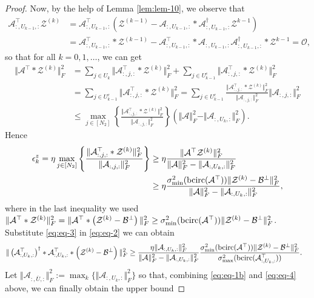 \documentclass[11pt]{article}
\def\fm#1{\mathcal{#1}}
\def \a#1{\fm A_{:, #1, :}}
\begin{document}
\begin{proof}
Now,  by the help of Lemma \ref{lem:lem-10}, we observe that
\begin{align*}
    \a{U_{k-1}}^\top \fm Z^{(k)} & = \a{U_{k-1}}^\top \left( \fm Z^{(k-1)} - \a{U_{k-1}}*\a{U_{k-1}}^\dagger \fm Z^{k-1} \right)\\
    & =  \a{U_{k-1}}^\top*\fm Z^{(k-1)} - \a{U_{k-1}}^\top *\a{U_{k-1}}\a{U_{k-1}}^\dagger* \fm Z^{k-1} = \fm O, 
\end{align*}
so that for all $k=0, 1, \ldots$, we can get
\begin{align*}
    \Vert \fm A^\top * \fm Z^{(k)}\Vert_F^2  & = \sum_{j \in U_k} \Vert \a j ^\top  * \fm Z^{(k)} \Vert_F^2 + \sum_{j\in U^c_{k-1}}\Vert \a j ^\top  * \fm Z^{(k)} \Vert_F^2 \\
    &=  \sum_{j\in U^c_{k-1}}\Vert \a j ^\top  * \fm Z^{(k)} \Vert_F^2  =  \sum_{j\in U^c_{k-1}} \frac{ \Vert \a j ^\top  * \fm Z^{(k)} \Vert_F^2}{ \Vert \a j \Vert_F^2}\Vert \a j \Vert_F^2\\
    & \leq \max_{j \in [N_2]}\left\{  \frac{ \Vert \a j ^\top  * \fm Z^{(k)} \Vert_F^2}{ \Vert \a j \Vert_F^2} \right\}\left(\Vert \fm A \Vert_F^2 - \Vert \a{U_k} \Vert_F^2 \right).
\end{align*}
Hence
\begin{align}
    \epsilon^z_k = \eta \max_{j \in [N_2]}\left\{  \frac{ \Vert \a j ^\top  * \fm Z^{(k)} \Vert_F^2}{ \Vert \a j \Vert_F^2} \right\} &\geq \eta \frac{ \Vert \fm A^\top \fm Z^{(k)}\Vert_F^2}{\Vert \fm A \Vert_F^2 - \Vert \a{U_k} \Vert_F^2} \notag\\
    & \geq \eta\frac{ \sigma_{\min}^2(\bcirc(\fm A^\top)) \Vert \fm Z^{(k)}-\fm B^\perp \Vert_F^2}{\Vert \fm A \Vert_F^2 - \Vert \a{U_k} \Vert_F^2},  \label{eq:eq-3}
\end{align}
where in the last inequality we used $ \Vert \fm A^\top *  \fm Z^{(k)}\Vert_F^2 =  \Vert \fm A^\top * \left( \fm Z^{(k)} - \fm B^\perp \right)\Vert_F^2 \geq \sigma_{\min}^2(\bcirc(\fm A^\top)) \Vert \fm Z^{(k)}-\fm B^\perp \Vert_F^2 $.\\
Substitute \eqref{eq:eq-3} in \eqref{eq:eq-2} we can obtain
\begin{align}
     \Vert \left(\a{U_k}^\top \right)^\dagger * \a{U_k}^\top *\left(\fm Z^{(k)}-\fm B^\perp \right) \Vert_F^2 & \geq \frac{\eta \Vert \a{U_k} \Vert_F^2}{\Vert \fm A \Vert_F^2 - \Vert \a{U_k} \Vert_F^2} \frac{\sigma_{\min}^2(\bcirc(\fm A^\top)) \Vert \fm Z^{(k)}-\fm B^\perp \Vert_F^2}{\sigma_{\max}^2(\bcirc(\a{U_k}^\top))}. \label{eq:eq-4}
\end{align}
Let $\Vert \a{\overline{U}} \Vert_F^2 := \max_k \{ \Vert \a{U_k}\Vert_F^2\}$ so that, combining \eqref{eq:eq-1b} and  \eqref{eq:eq-4} above, we can finally obtain the upper bound

\end{proof}
\end{document}
